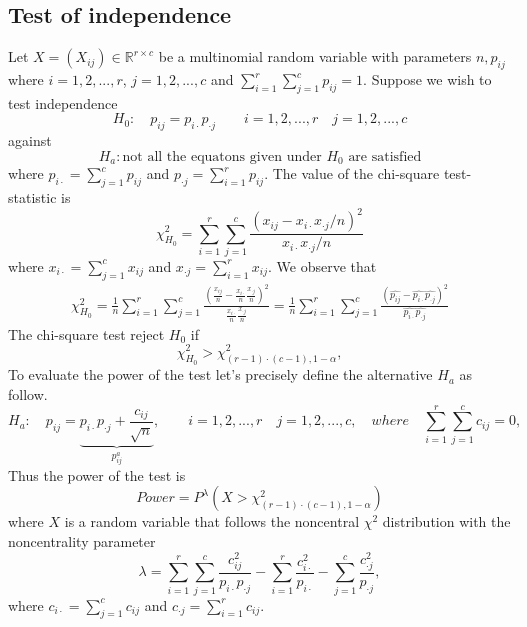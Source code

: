 \documentclass{article}
\begin{document}
\subsection{Test of independence}
Let $X=(X_{ij}) \in \mathbb{R}^{r \times c}$ be a multinomial random variable with
parameters $n,p_{ij}$ where $i=1,2,...,r$, $j=1,2,...,c$ and 
$\sum_{i=1}^r\sum_{j=1}^cp_{ij}=1$. 
Suppose we wish to test independence
\begin{equation}
    H_0: \quad p_{ij}=p_{i \cdot}p_{\cdot j} \qquad i =1,2,...,r \quad j=1,2,...,c
\end{equation}
against
\begin{equation}
    H_a: \mbox{not all the equatons given under $H_0$ are satisfied}
\end{equation}
where $p_{i \cdot} = \sum_{j=1}^c p_{ij}$ and $p_{\cdot j} = \sum_{i=1}^r p_{ij}$.
The value of the chi-square test-statistic is
\begin{equation}
    \chi^2_{H_0} = \sum_{i=1}^r\sum_{j=1}^c \frac{\left(x_{ij} - x_{i \cdot}x_{\cdot j}/n\right)^2}{x_{i \cdot}x_{\cdot j}/n}
\end{equation}
where $x_{i \cdot} = \sum_{j=1}^c x_{ij}$ and $x_{\cdot j} = \sum_{i=1}^r x_{ij}$.
We observe that
\begin{align}
    \chi^2_{H_0} =\frac{1}{n} \sum_{i=1}^r\sum_{j=1}^c \frac{\left(\frac{x_{ij}}{n} - \frac{x_{i \cdot}}{n}\frac{x_{\cdot j}}{n}\right)^2}{\frac{x_{i \cdot}}{n}\frac{x_{\cdot j}}{n}}=  \frac{1}{n} \sum_{i=1}^r\sum_{j=1}^c \frac{\left(\widehat{p_{ij}} - \widehat{p_{i \cdot}}\widehat{p_{\cdot j}}\right)^2}{\widehat{p_{i \cdot}}\widehat{p_{\cdot j}}}
\end{align}
The chi-square test reject $H_0$ if
\begin{equation}
    \chi^2_{H_0} > \chi^2_{(r-1)\cdot(c-1),1-\alpha},
\end{equation}
To evaluate the power of the test let's precisely define the alternative $H_a$ as follow.
\begin{equation}
    H_a: \quad p_{ij} =\underbrace{p_{i\cdot}p_{\cdot j} + \frac{c_{ij}}{\sqrt{n}}}_{p^a_{ij}}, \qquad i =1,2,...,r \quad j=1,2,...,c, \quad where \quad \sum_{i=1}^{r}\sum_{j=1}^{c}c_{ij}=0, 
\end{equation}
Thus the power of the test is
\begin{equation}
    Power = P^{\lambda}\left(X > \chi^2_{(r-1)\cdot(c-1),1-\alpha}\right)
\end{equation}
where $X$ is a random variable that follows the noncentral $\chi^2$ distribution with the noncentrality parameter
\begin{equation}
    \lambda = \sum_{i=1}^{r}\sum_{j=1}^c \frac{c_{ij}^2}{p_{i\cdot}p_{\cdot j}} - \sum_{i=1}^{r}\frac{c_{i \cdot}^2}{p_{i \cdot}} - \sum_{j=1}^{c}\frac{c_{\cdot j}^2}{p_{\cdot j}},
\end{equation}
where $c_{i \cdot} = \sum_{j=1}^c c_{ij}$ and $c_{\cdot j} = \sum_{i=1}^r c_{ij}$.
\end{document}
